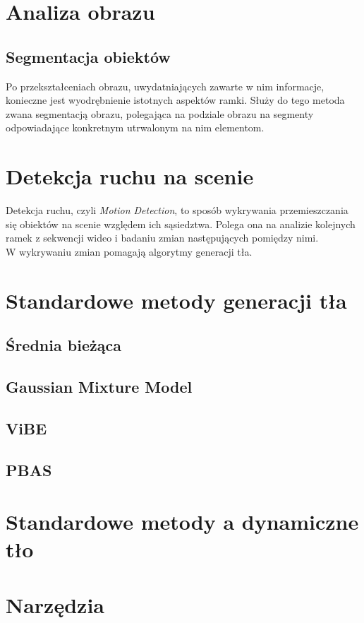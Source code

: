 \section{Analiza obrazu} 
\subsection{Segmentacja obiektów}
Po przekształceniach obrazu, uwydatniających zawarte w nim informacje, konieczne jest wyodrębnienie istotnych aspektów ramki. Służy do tego metoda zwana segmentacją obrazu, polegająca na podziale obrazu na segmenty odpowiadające konkretnym utrwalonym na nim elementom.
\section{Detekcja ruchu na scenie}
Detekcja ruchu, czyli \textit{Motion Detection}, to sposób wykrywania przemieszczania się obiektów na scenie względem ich sąsiedztwa. Polega ona na analizie kolejnych ramek z sekwencji wideo i badaniu zmian następujących pomiędzy nimi.\\
W wykrywaniu zmian pomagają algorytmy generacji tła.
\section{Standardowe metody generacji tła}
\subsection{Średnia bieżąca}
\cite{collins2003mean}
\subsection{Gaussian Mixture Model}
\label{sec:GMM}
\cite{zivkovic2004improved}
\subsection{ViBE}
\cite{barnich2011vibe}
\subsection{PBAS}
\cite{hofmann2012background}
\section{Standardowe metody a dynamiczne tło}
\section{Narzędzia}
